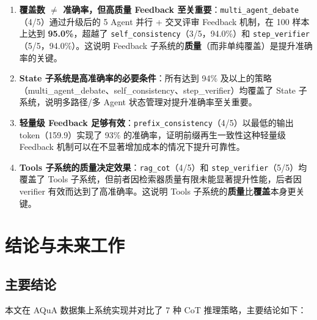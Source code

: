 \documentclass[lang=cn,a4paper,newtx]{elegantpaper}
\begin{document}
\begin{enumerate}
  \item \textbf{覆盖数 $\neq$ 准确率，但高质量 Feedback 至关重要}：\texttt{multi\_agent\_debate}（4/5）通过升级后的 5 Agent 并行 + 交叉评审 Feedback 机制，在 100 样本上达到 \textbf{95.0\%}，超越了 \texttt{self\_consistency}（3/5，94.0\%）和 \texttt{step\_verifier}（5/5，94.0\%）。这说明 Feedback 子系统的\textbf{质量}（而非单纯覆盖）是提升准确率的关键。
  \item \textbf{State 子系统是高准确率的必要条件}：所有达到 94\% 及以上的策略（multi\_agent\_debate、self\_consistency、step\_verifier）均覆盖了 State 子系统，说明多路径/多 Agent 状态管理对提升准确率至关重要。
  \item \textbf{轻量级 Feedback 足够有效}：\texttt{prefix\_consistency}（4/5）以最低的输出 token（159.9）实现了 93\% 的准确率，证明前缀再生一致性这种轻量级 Feedback 机制可以在不显著增加成本的情况下提升可靠性。
  \item \textbf{Tools 子系统的质量决定效果}：\texttt{rag\_cot}（4/5）和 \texttt{step\_verifier}（5/5）均覆盖了 Tools 子系统，但前者因检索器质量有限未能显著提升性能，后者因 verifier 有效而达到了高准确率。这说明 Tools 子系统的\textbf{质量}比\textbf{覆盖}本身更关键。
\end{enumerate}

\section{结论与未来工作}

\subsection{主要结论}

本文在 AQuA 数据集上系统实现并对比了 7 种 CoT 推理策略，主要结论如下：
\end{document}
